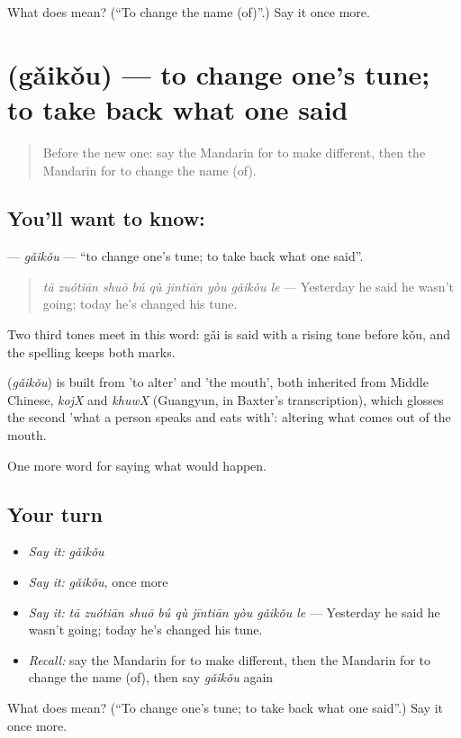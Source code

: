 \begin{tcolorbox}[breakable,colback=teal!4,colframe=teal!35!black,title={Before you move on}]
What does  mean? (\textquotedblleft{}To change the name (of)\textquotedblright{}.) Say it once more.
\end{tcolorbox}
\section[\texorpdfstring{\zh{改口} (gǎikǒu)}{改口 (gǎikǒu)}]{ (gǎikǒu) — to change one's tune; to take back what one said}

\label{lesson:ZH-C392-gaikou}



\begin{quote}
Before the new one: say the Mandarin for to make different, then the Mandarin for to change the name (of).
\end{quote}

\subsection*{You'll want to know: }
\textbf{} — \emph{gǎikǒu} — \textquotedblleft{}to change one's tune; to take back what one said\textquotedblright{}.

\begin{quote}
\emph{tā zuótiān shuō bú qù jīntiān yòu gǎikǒu le} — Yesterday he said he wasn't going; today he's changed his tune.
\end{quote}

Two third tones meet in this word: gǎi is said with a rising tone before kǒu, and the spelling keeps both marks.

\begin{cousinweb}
\textbf{} (\emph{gǎikǒu}) is built from  'to alter' and  'the mouth', both inherited from Middle Chinese, \emph{kojX} and \emph{khuwX} (Guangyun, in Baxter's transcription), which glosses the second 'what a person speaks and eats with': altering what comes out of the mouth.
\end{cousinweb}

\begin{grammarlens}[title={What you've built}]
One more word for saying what would happen.
\end{grammarlens}

\subsection*{Your turn}
\begin{itemize}
\raggedright
  \item \emph{Say it:} \emph{gǎikǒu}
  \item \emph{Say it:} \emph{gǎikǒu}, once more
  \item \emph{Say it:} \emph{tā zuótiān shuō bú qù jīntiān yòu gǎikǒu le} — Yesterday he said he wasn't going; today he's changed his tune.
  \item \emph{Recall:} say the Mandarin for to make different, then the Mandarin for to change the name (of), then say \emph{gǎikǒu} again
\end{itemize}

\begin{tcolorbox}[breakable,colback=teal!4,colframe=teal!35!black,title={Before you move on}]
What does  mean? (\textquotedblleft{}To change one's tune; to take back what one said\textquotedblright{}.) Say it once more.
\end{tcolorbox}
